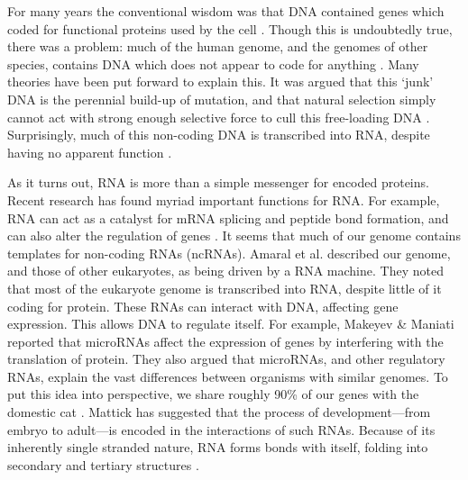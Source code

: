 \documentclass{cshonours}
\begin{document}
For many years the conventional wisdom was that DNA contained genes which coded for functional proteins used by the cell \cite{albertsessential}. Though this is undoubtedly true, there was a problem: much of the human genome, and the genomes of other species, contains DNA which does not appear to code for anything \cite{beaton1999eukaryotic}. Many theories have been put forward to explain this. It was argued that this `junk' DNA is the perennial build-up of mutation, and that natural selection simply cannot act with strong enough selective force to cull this free-loading DNA \cite{beaton1999eukaryotic}. Surprisingly, much of this non-coding DNA is transcribed into RNA, despite having no apparent function \cite{leung2013coral}. 

As it turns out, RNA is more than a simple messenger for encoded proteins. Recent research has found myriad important functions for RNA. For example, RNA can act as a catalyst for mRNA splicing and peptide bond formation, and can also alter the regulation of genes \cite{xu2012statistical}. It seems that much of our genome contains templates for non-coding RNAs (ncRNAs). Amaral et al. \cite{amaral2008eukaryotic} described our genome, and those of other eukaryotes, as being driven by a RNA machine. They noted that most of the eukaryote genome is transcribed into RNA, despite little of it coding for protein. These RNAs can interact with DNA, affecting gene expression. This allows DNA to regulate itself. For example, Makeyev \& Maniati \cite{makeyev2008multilevel} reported that microRNAs affect the expression of genes by interfering with the translation of protein. They also argued that microRNAs, and other regulatory RNAs, explain the vast differences between organisms with similar genomes. To put this idea into perspective, we share roughly 90\% of our genes with the domestic cat \cite{pontius2007initial}. Mattick \cite{mattick2007new} has suggested that the process of development---from embryo to adult---is encoded in the interactions of such RNAs. Because of its inherently single stranded nature, RNA forms bonds with itself, folding into secondary and tertiary structures \cite{conn1998rna}.
\end{document}
